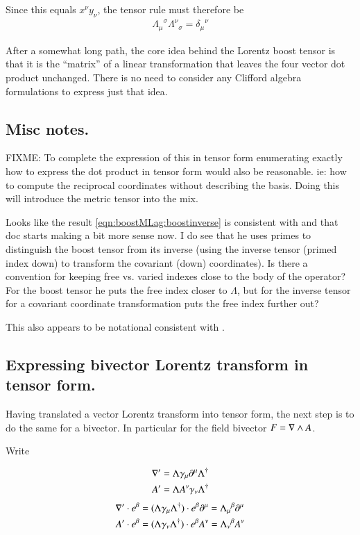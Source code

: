Since this equals $x^\nu y_\nu$, the tensor rule must therefore be
\begin{align}\label{eqn:boostMLag:boostinverse}
{\Lambda_{\mu}}^{\sigma} {\Lambda^{\nu}}_{\sigma} = {\delta_\mu}^\nu
\end{align}

After a somewhat long path, the core idea behind the Lorentz boost tensor
is that it is the ``matrix'' of a linear transformation that leaves
the four vector dot product unchanged.  There is no need to consider
any Clifford algebra formulations to express just that idea.

\subsection{Misc notes. }

FIXME: To complete
the expression of this in tensor form enumerating exactly how to express
the dot product in tensor form would also be reasonable.  ie: how to compute
the reciprocal coordinates without describing the basis.  Doing this
will introduce the metric tensor into the mix.

Looks like the result \ref{eqn:boostMLag:boostinverse}
is consistent with \citep{MinahanTensors} and
that doc starts making a bit more sense now.  I do see that
he uses primes to distinguish the boost tensor from its inverse (using
the inverse tensor (primed index down) to transform the covariant (down)
coordinates).  Is there a convention for keeping free vs. varied indexes
close to the body of the operator?  For the boost tensor he puts the free
index closer to $\Lambda$, but for the inverse tensor for a covariant
coordinate transformation puts the free index further out?

This also appears to be notational consistent with \citep{SpenceTensors}.

\subsection{Expressing bivector Lorentz transform in tensor form. }

Having translated a vector Lorentz transform into tensor form, the next step is to do the same for
a bivector.  In particular for the field bivector $F = \nabla \wedge A$.

Write

\begin{align*}
\nabla' &= \Lambda \gamma_\mu \partial^\mu \Lambda^\dagger \\
A' &= \Lambda A^\nu \gamma_\nu \Lambda^\dagger \\
\end{align*}
\begin{align*}
\nabla' \cdot e^\beta &= (\Lambda \gamma_\mu \Lambda^\dagger) \cdot e^\beta \partial^\mu = {\Lambda_\mu}^\beta \partial^\mu \\
A' \cdot e^\beta &= (\Lambda \gamma_\nu \Lambda^\dagger) \cdot e^\beta A^\nu = {\Lambda_\nu}^\beta A^\nu \\
\end{align*}

